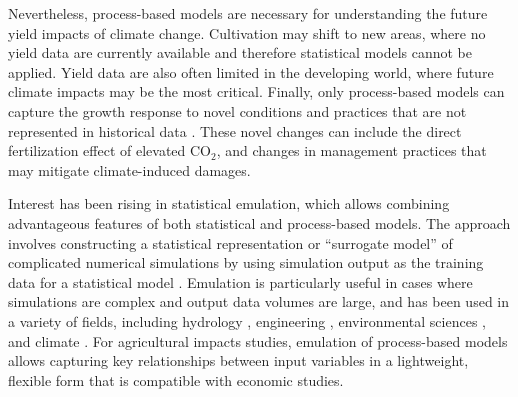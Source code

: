\documentclass[gmd, manuscript]{copernicus} %
\begin{document}
Nevertheless, process-based models are necessary for understanding the future yield impacts of climate change. Cultivation may shift to new areas, where no yield data are currently available and therefore statistical models cannot be applied. Yield data are also often limited in the developing world, where future climate impacts may be the most critical. Finally, only process-based models can capture the growth response to novel conditions and practices that are not represented in historical data \citep[e.g.][]{pugh_climate_2016, Roberts2017}. These novel changes can include the direct fertilization effect of elevated CO$_2$, and changes in management practices that may mitigate climate-induced damages.

Interest has been rising in statistical emulation, which allows combining advantageous features of both statistical and process-based models. The approach involves constructing a statistical representation or ``surrogate model'' of complicated numerical simulations by using simulation output as the training data for a statistical model \citep[e.g.][]{OHAGAN2006, OHAGAN2010}. Emulation is particularly useful in cases where simulations are complex and output data volumes are large,  and  has been used in a variety of fields, including hydrology \citep[e.g.][]{Razavi2012}, engineering \citep[e.g.][]{STORLIE2009}, environmental sciences \citep[e.g.][]{RATTO2012}, and climate \citep[e.g.][]{Castruccio14, Holden2014}. For agricultural impacts studies, emulation of process-based models allows capturing key relationships between input variables in a lightweight, flexible form that is compatible with economic studies. 

\end{document}
